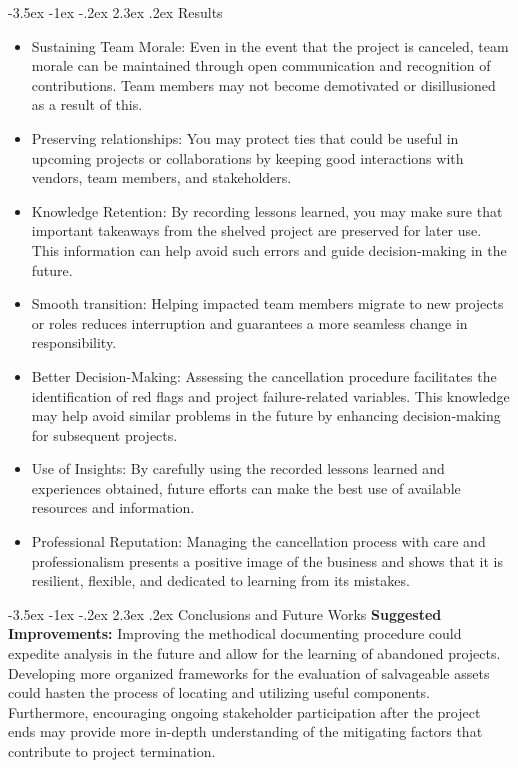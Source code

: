 \documentclass[11pt]{article}
\makeatletter
\renewcommand\section{\@startsection {section}{1}{\z@}%
                                       {-3.5ex \@plus -1ex \@minus -.2ex}%
                                       {2.3ex \@plus.2ex}%
                                       {\normalfont\fontfamily{phv}\fontsize{14}{17}\bfseries}}
\makeatother
\begin{document}
{    \section{Results}
    \begin{itemize}
        \item Sustaining Team Morale: Even in the event that the project is canceled, team morale can be maintained through open communication and recognition of contributions. Team members may not become demotivated or disillusioned as a result of this.
        \item Preserving relationships: You may protect ties that could be useful in upcoming projects or collaborations by keeping good interactions with vendors, team members, and stakeholders.
        \item Knowledge Retention: By recording lessons learned, you may make sure that important takeaways from the shelved project are preserved for later use. This information can help avoid such errors and guide decision-making in the future.
        \item Smooth transition: Helping impacted team members migrate to new projects or roles reduces interruption and guarantees a more seamless change in responsibility.
        \item Better Decision-Making: Assessing the cancellation procedure facilitates the identification of red flags and project failure-related variables. This knowledge may help avoid similar problems in the future by enhancing decision-making for subsequent projects.
        \item Use of Insights: By carefully using the recorded lessons learned and experiences obtained, future efforts can make the best use of available resources and information.
        \item Professional Reputation: Managing the cancellation process with care and professionalism presents a positive image of the business and shows that it is resilient, flexible, and dedicated to learning from its mistakes.

    \end{itemize}
    
    \section{Conclusions and Future Works}
    \hspace{1cm} \textbf{Suggested Improvements:} Improving the methodical documenting procedure could expedite analysis in the future and allow for the learning of abandoned projects. Developing more organized frameworks for the evaluation of salvageable assets could hasten the process of locating and utilizing useful components. Furthermore, encouraging ongoing stakeholder participation after the project ends may provide more in-depth understanding of the mitigating factors that contribute to project termination. 
    
}
\end{document}
